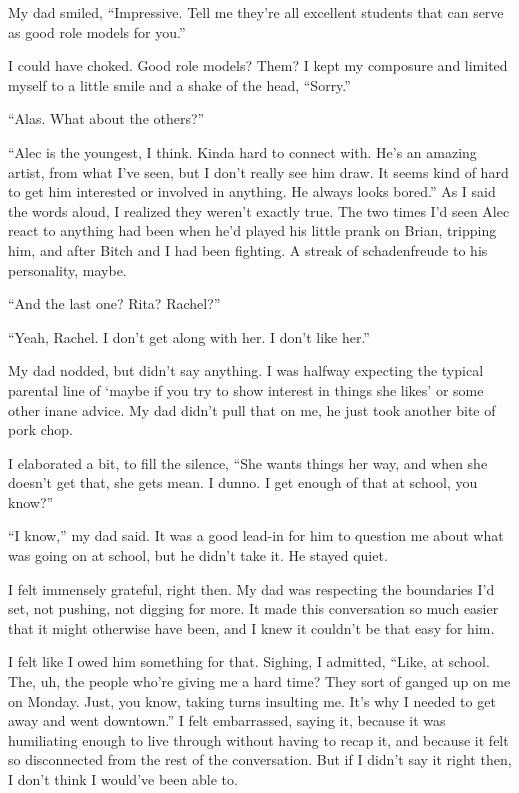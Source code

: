 My dad smiled, ``Impressive.  Tell me they're all excellent students that can serve as good role models for you.''



I could have choked.  Good role models?  Them?  I kept my composure and limited myself to a little smile and a shake of the head, ``Sorry.''



``Alas.  What about the others?''



``Alec is the youngest, I think.  Kinda hard to connect with.  He's an amazing artist, from what I've seen, but I don't really see him draw.  It seems kind of hard to get him interested or involved in anything.  He always looks bored.''  As I said the words aloud, I realized they weren't exactly true.  The two times I'd seen Alec react to anything had been when he'd played his little prank on Brian, tripping him, and after Bitch and I had been fighting.  A streak of schadenfreude to his personality, maybe.



``And the last one?  Rita?  Rachel?''



``Yeah, Rachel.  I don't get along with her.  I don't like her.''



My dad nodded, but didn't say anything.  I was halfway expecting the typical parental line of `maybe if you try to show interest in things she likes' or some other inane advice.  My dad didn't pull that on me, he just took another bite of pork chop.



I elaborated a bit, to fill the silence, ``She wants things her way, and when she doesn't get that, she gets mean.  I dunno.  I get enough of that at school, you know?''



``I know,'' my dad said.  It was a good lead-in for him to question me about what was going on at school, but he didn't take it.  He stayed quiet.



I felt immensely grateful, right then.  My dad was respecting the boundaries I'd set, not pushing, not digging for more.  It made this conversation so much easier that it might otherwise have been, and I knew it couldn't be that easy for him.



I felt like I owed him something for that.  Sighing, I admitted, ``Like, at school.  The, uh, the people who're giving me a hard time?  They sort of ganged up on me on Monday.  Just, you know, taking turns insulting me.  It's why I needed to get away and went downtown.''  I felt embarrassed, saying it, because it was humiliating enough to live through without having to recap it, and because it felt so disconnected from the rest of the conversation.  But if I didn't say it right then, I don't think I would've been able to.



